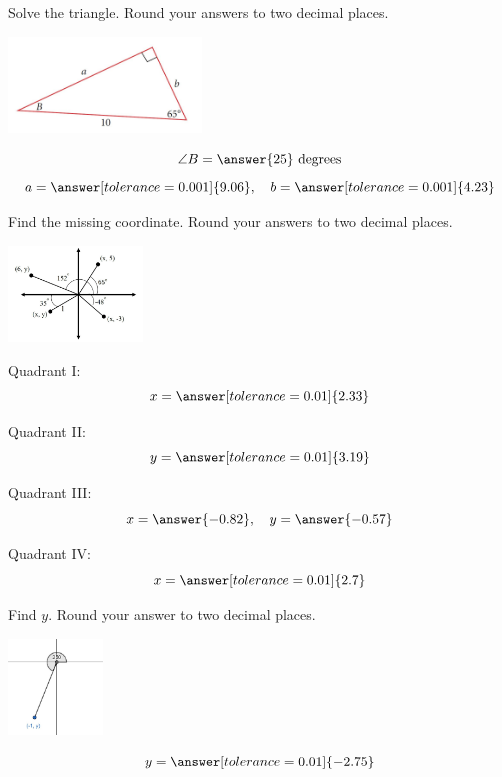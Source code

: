 \documentclass{ximera}
\begin{document}
\begin{problem}\label{prob:160hom10prob6}
Solve the triangle. Round your answers to two decimal places.
\begin{image}
   
\includegraphics[height=1in]{160H10pic4.jpg}~
 
\end{image}

$$\angle B=\answer{25}\mbox{ degrees}$$
$$a=\answer[tolerance=0.001]{9.06},\quad b=\answer[tolerance=0.001]{4.23}$$
\end{problem}



\begin{problem}\label{prob:160hom10prob7}
Find the missing coordinate.  Round your answers to two decimal places.
\begin{image}
   
\includegraphics[height=1in]{160H10pic2.jpg}~
 
\end{image}

Quadrant I:
$$x=\answer[tolerance=0.01]{2.33}$$

Quadrant II:
$$y=\answer[tolerance=0.01]{3.19}$$

Quadrant III:
$$x=\answer{-0.82},\quad y=\answer{-0.57}$$

Quadrant IV:
$$x=\answer[tolerance=0.01]{2.7}$$
\end{problem}

\begin{problem}\label{prob:160hom10prob8}
Find $y$.  Round your answer to two decimal places.
 
 \begin{image}
   
\includegraphics[height=1in]{160H10pic1.jpg}

\end{image}
$$y=\answer[tolerance=0.01]{-2.75}$$
\end{problem}
\end{document}
